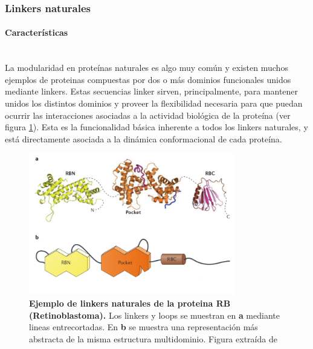 
\subsubsection{Linkers naturales}


\paragraph{Características} \hspace{0pt} \\ \indent 
La modularidad en proteínas naturales es algo muy común y existen muchos ejemplos de proteinas compuestas por dos o más dominios funcionales unidos mediante linkers.
Estas secuencias linker sirven, principalmente, para mantener unidos los distintos dominios y proveer la flexibilidad necesaria para que puedan ocurrir las interacciones asociadas a la actividad biológica de la proteína
(ver figura \ref{multidomainRb}). Esta es la funcionalidad básica inherente a todos los linkers naturales, y está directamente asociada a la dinámica conformacional de cada proteína. 


\begin{figure}[ht]
\centering
\includegraphics[width=0.8\textwidth]{img/multidomainRb.png} 
\caption{\textbf{Ejemplo de linkers naturales de la proteina RB (Retinoblastoma).} Los linkers y loops se muestran en \textbf{a} mediante lineas entrecortadas. 
En \textbf{b} se muestra una representación más abstracta de la misma estructura multidominio. Figura extraída de \cite{dick2013molecular}} 
\label{multidomainRb}
\end{figure}


